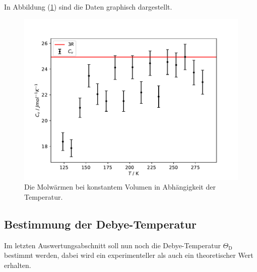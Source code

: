 \FloatBarrier
\newpage
\noindent In Abbildung (\ref{fig:cv1}) sind die Daten graphisch dargestellt.
\begin{figure}[h]
	\centering
	\includegraphics[scale=0.9]{fig/plot3.pdf}
	\caption{Die Molwärmen bei konstantem Volumen in Abhängigkeit der Temperatur.}
	\label{fig:cv1}
\end{figure}
\FloatBarrier


\subsection{Bestimmung der Debye-Temperatur}
Im letzten Auswertungsabschnitt soll nun noch die Debye-Temperatur $\Theta_\mathrm{D}$ bestimmt werden, dabei wird ein experimenteller als auch ein theoretischer Wert erhalten.
